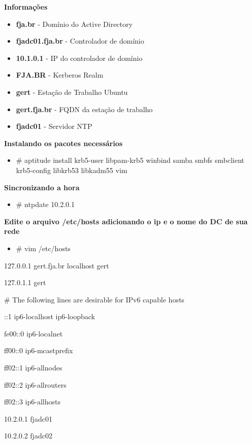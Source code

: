\textbf{Informações}

\begin{itemize}
	\item \textbf{fja.br} -  Domínio do Active Directory
	\item \textbf{fjadc01.fja.br} - Controlador de domínio
	\item \textbf{10.1.0.1} - IP do controlador de domínio
	\item \textbf{FJA.BR} - Kerberos Realm
	\item \textbf{gert} - Estação de Trabalho Ubuntu
	\item \textbf{gert.fja.br} - FQDN da estação de trabalho
	\item \textbf{fjadc01} - Servidor NTP
\end{itemize}

\textbf{Instalando os pacotes necessários}

\begin{itemize}
	\item {\# aptitude install krb5-user libpam-krb5 winbind samba smbfs smbclient krb5-config libkrb53 libkadm55 vim}
\end{itemize}

\textbf{Sincronizando a hora}

\begin{itemize}
	\item {\# ntpdate 10.2.0.1}
\end{itemize}

\textbf{Edite o arquivo /etc/hosts adicionando o ip e o nome do DC de sua rede}

\begin{itemize}
	\item {\# vim /etc/hosts}
\end{itemize}

127.0.0.1       gert.fja.br localhost gert

127.0.1.1       gert

\# The following lines are desirable for IPv6 capable hosts

::1     ip6-localhost ip6-loopback

fe00::0 ip6-localnet

ff00::0 ip6-mcastprefix

ff02::1 ip6-allnodes

ff02::2 ip6-allrouters

ff02::3 ip6-allhosts

10.2.0.1   fjadc01

10.2.0.2   fjadc02

